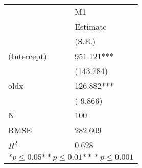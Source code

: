 \begin{tabular}{*{2}{l}}
\hline
                  & M1   \tabularnewline
                   &Estimate \tabularnewline
                 &(S.E.) \tabularnewline
 \hline
 \hline
   (Intercept)     &951.121*** \tabularnewline
                 &(143.784)  \tabularnewline
   oldx            &126.882*** \tabularnewline
                 &(  9.866)  \tabularnewline
 \hline
 N                 &100       \tabularnewline
 RMSE             &282.609   \tabularnewline
 $R^2$             &0.628   \tabularnewline
 \hline
\hline
 
 \multicolumn{2}{c}{${*  p}\le 0.05$${*\!\!*  p}\le 0.01$${*\!\!*\!\!*  p}\le 0.001$}\tabularnewline
 \end{tabular}
